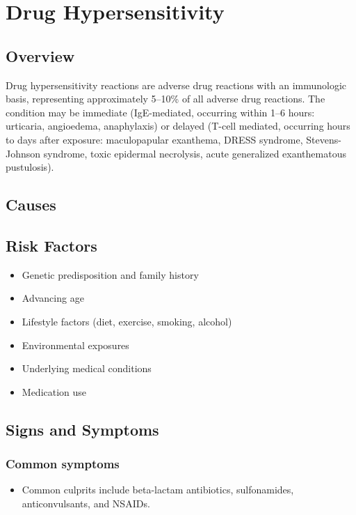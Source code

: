 \chapter{Drug Hypersensitivity}
\label{sec:Drug Hypersensitivity}

\section{Overview}
Drug hypersensitivity reactions are adverse drug reactions with an immunologic basis, representing approximately 5--10\% of all adverse drug reactions. The condition may be immediate (IgE-mediated, occurring within 1--6 hours: urticaria, angioedema, anaphylaxis) or delayed (T-cell mediated, occurring hours to days after exposure: maculopapular exanthema, DRESS syndrome, Stevens-Johnson syndrome, toxic epidermal necrolysis, acute generalized exanthematous pustulosis).
\section{Causes}
\section{Risk Factors}

\begin{itemize}[noitemsep]
  \item Genetic predisposition and family history
  \item Advancing age
  \item Lifestyle factors (diet, exercise, smoking, alcohol)
  \item Environmental exposures
  \item Underlying medical conditions
  \item Medication use
\end{itemize}
\section{Signs and Symptoms}

\subsection{Common symptoms}
\begin{itemize}[noitemsep]
  \item Common culprits include beta-lactam antibiotics, sulfonamides, anticonvulsants, and NSAIDs. 
  \end{itemize}

